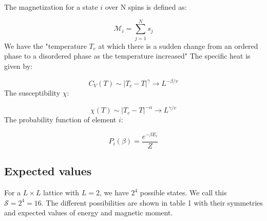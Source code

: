 \documentclass{article}
\begin{document}
The magnetization for a state $i$ over N spins is defined as:

\begin{equation}
    \mathscr{M}_i = \sum_{j=1}^N s_j
\end{equation}
We have the "temperature $T_c$ at which there is a sudden change from an ordered phase to a disordered phase as the temperature increased"\cite{esp}
The specific heat is given by:

\begin{equation}
    C_V(T) \sim |T_c-T|^{\gamma} \rightarrow L^{-\beta /v}
\end{equation}
The susceptibility $\chi$:

\begin{equation}
    \chi (T) \sim |T_c - T|^{-\alpha} \rightarrow L^{\gamma /v}
\end{equation}
The probability function of element $i$:

\begin{equation}
    P_i(\beta) = \frac{e^{-\beta E_i}}{Z}
\end{equation}


\subsection{Expected values}

For a $L \times L$ lattice with $L = 2$, we have $2^4$ possible states. We call this $\mathcal{S} = 2^4 = 16$. The different possibilities are shown in table 1 with their symmetries and expected values of energy and magnetic moment.
\end{document}
